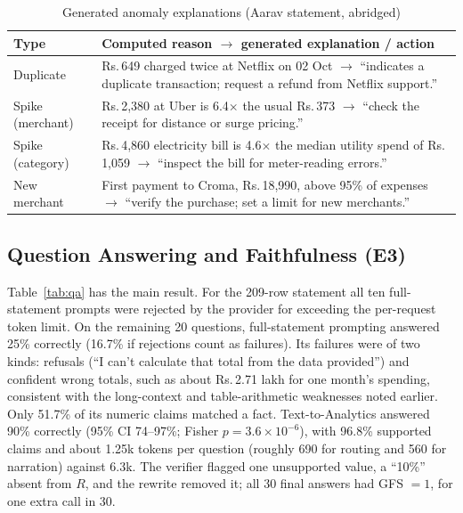 \documentclass[conference]{IEEEtran}
\DeclareRobustCommand{\rupee}{Rs.\,}
\begin{document}
\begin{table}[t]
\caption{Generated anomaly explanations (Aarav statement, abridged)}
\label{tab:explain}
\centering
\footnotesize
\begin{tabular}{@{}p{}p{}@{}}
\toprule
Type & Computed reason $\rightarrow$ generated explanation / action \\
\midrule
Duplicate & Rs.\,649 charged twice at Netflix on 02 Oct $\rightarrow$ ``indicates a duplicate transaction; request a refund from Netflix support.'' \\
Spike (merchant) & Rs.\,2,380 at Uber is 6.4$\times$ the usual Rs.\,373 $\rightarrow$ ``check the receipt for distance or surge pricing.'' \\
Spike (category) & Rs.\,4,860 electricity bill is 4.6$\times$ the median utility spend of Rs.\,1,059 $\rightarrow$ ``inspect the bill for meter-reading errors.'' \\
New merchant & First payment to Croma, Rs.\,18,990, above 95\% of expenses $\rightarrow$ ``verify the purchase; set a limit for new merchants.'' \\
\bottomrule
\end{tabular}
\end{table}

\subsection{Question Answering and Faithfulness (E3)}
Table~\ref{tab:qa} has the main result. For the 209-row statement all ten full-statement prompts were rejected by the provider for exceeding the per-request token limit. On the remaining 20 questions, full-statement prompting answered 25\% correctly (16.7\% if rejections count as failures). Its failures were of two kinds: refusals (``I can't calculate that total from the data provided'') and confident wrong totals, such as about \rupee 2.71 lakh for one month's spending, consistent with the long-context \cite{liu2024lost} and table-arithmetic \cite{chen2021finqa} weaknesses noted earlier. Only 51.7\% of its numeric claims matched a fact. Text-to-Analytics answered 90\% correctly (95\% CI 74--97\%; Fisher $p=3.6\times10^{-6}$), with 96.8\% supported claims and about 1.25k tokens per question (roughly 690 for routing and 560 for narration) against 6.3k. The verifier flagged one unsupported value, a ``10\%'' absent from $R$, and the rewrite removed it; all 30 final answers had GFS $=1$, for one extra call in 30.
\end{document}
